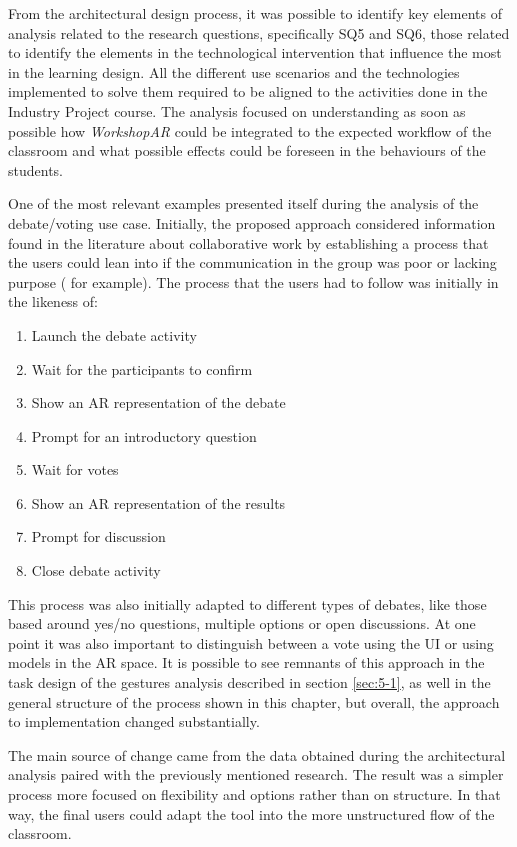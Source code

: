 From the architectural design process, it was possible to identify key elements of analysis related to the research questions, specifically SQ5 and SQ6, those related to identify the
elements in the technological intervention that influence the most in the learning design. All the different use scenarios and the technologies implemented to solve them required to be
aligned to the activities done in the Industry Project course. The analysis focused on understanding as soon as possible how \emph{WorkshopAR} could be integrated to the expected workflow
of the classroom and what possible effects could be foreseen in the behaviours of the students.

One of the most relevant examples presented itself during the analysis of the debate/voting use case. Initially, the proposed approach considered information found in the literature about
collaborative work by establishing a process that the users could lean into if the communication in the group was poor or lacking purpose (\textcite{galbraith_2013,gardner_1998} for
example). The process that the users had to follow was initially in the likeness of:

\begin{enumerate}
    \item Launch the debate activity
    \item Wait for the participants to confirm
    \item Show an \ac{AR} representation of the debate
    \item Prompt for an introductory question
    \item Wait for votes
    \item Show an \ac{AR} representation of the results
    \item Prompt for discussion
    \item Close debate activity
\end{enumerate}

This process was also initially adapted to different types of debates, like those based around yes/no questions, multiple options or open discussions. At one point it was also important
to distinguish between a vote using the UI or using models in the \ac{AR} space. It is possible to see remnants of this approach in the task design of the gestures analysis described in
section \ref{sec:5-1}, as well in the general structure of the process shown in this chapter, but overall, the approach to implementation changed substantially.

The main source of change came from the data obtained during the architectural analysis paired with the previously mentioned research. The result was a simpler process more focused on
flexibility and options rather than on structure. In that way, the final users could adapt the tool into the more unstructured flow of the classroom.

